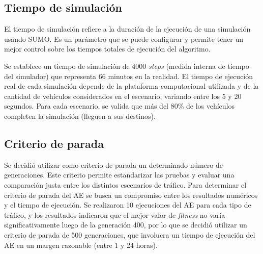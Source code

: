\subsection{Tiempo de simulación}
El tiempo de simulación refiere a la duración de la ejecución de una simulación usando SUMO. Es un parámetro que se puede configurar y permite tener un mejor control sobre los tiempos totales de ejecución del algoritmo.

Se establece un tiempo de simulación de 4000 \emph{steps} (medida interna de tiempo del simulador) que representa 66 minutos en la realidad. El tiempo de ejecución real de cada simulación depende de la plataforma computacional utilizada y de la cantidad de vehículos considerados en el escenario, variando entre los 5 y 20 segundos. Para cada escenario, se valida que más del 80\% de los vehículos completen la simulación (lleguen a sus destinos). 


\subsection{Criterio de parada}
Se decidió utilizar como criterio de parada un determinado número de generaciones. Este criterio permite estandarizar las pruebas y evaluar una comparación justa entre los distintos escenarios de tráfico. Para determinar el 
criterio de parada del AE se busca un compromiso entre los resultados numéricos y el tiempo de ejecución. 
Se realizaron 10 ejecuciones del AE para cada tipo de tráfico, y los resultados indicaron que el mejor valor de \emph{fitness} no varía significativamente luego de la generación 400, por lo que se decidió utilizar un criterio de parada de 500 generaciones, que involucra un tiempo de ejecución del AE en un margen razonable (entre 1 y 24 horas). 



